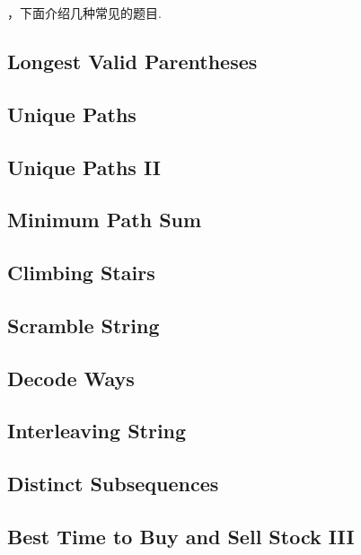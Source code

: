\documentclass{article}
\begin{document}
\begin{CJK}{UTF8}{gbsn}     %

\else
    
，下面介绍几种常见的题目.
\\
\fi
\subsection{Longest Valid Parentheses}

\subsection{Unique Paths}

\subsection{Unique Paths II}

\subsection{Minimum Path Sum}

\subsection{Climbing Stairs}

\subsection{Scramble String}

\subsection{Decode Ways}

\subsection{Interleaving String}

\subsection{Distinct Subsequences}

\subsection{Best Time to Buy and Sell Stock III}


\end{CJK}
\end{document}
